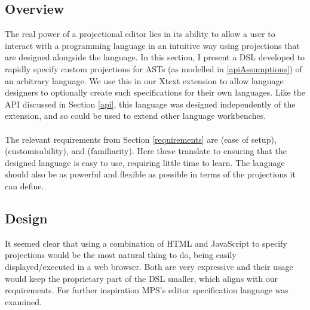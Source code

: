 \documentclass{article}
\begin{document}
{\subsection{Overview}
The real power of a projectional editor lies in its ability to allow a user to interact with a programming language in an intuitive way using projections that are designed alongside the language. In this section, I present a DSL developed to rapidly specify custom projections for ASTs (as modelled in \ref{apiAssumptions}) of an arbitrary language. We use this in our Xtext extension to allow language designers to optionally create such specifications for their own languages. Like the API discussed in Section \ref{api}, this language was designed independently of the extension, and so could be used to extend other language workbenches.
\\
\\
The relevant requirements from Section \ref{requirements} are \RSetup (ease of setup), \RCustom (customisability), and \RFamiliarity (familiarity). Here these translate to ensuring that the designed language is easy to use, requiring little time to learn. The language should also be as powerful and flexible as possible in terms of the projections it can define.

\subsection{Design}

It seemed clear that using a combination of HTML and JavaScript to specify projections would be the most natural thing to do, being easily displayed/executed in a web browser. Both are very expressive and their usage would keep the proprietary part of the DSL smaller, which aligns with our requirements. For further inspiration MPS's editor specification language was examined.

}
\end{document}
